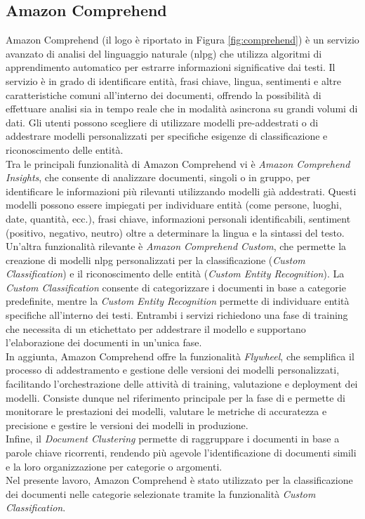 \subsection{Amazon Comprehend}
Amazon Comprehend (il logo è riportato in Figura \ref{fig:comprehend}) è un servizio avanzato di analisi del linguaggio naturale (\gls{nlpg}) che utilizza algoritmi di apprendimento automatico per estrarre informazioni significative dai testi. Il servizio è in grado di identificare entità, frasi chiave, lingua, sentimenti e altre caratteristiche comuni all'interno dei documenti, offrendo la possibilità di effettuare analisi sia in tempo reale che in modalità asincrona su grandi volumi di dati. Gli utenti possono scegliere di utilizzare modelli pre-addestrati o di addestrare modelli personalizzati per specifiche esigenze di classificazione e riconoscimento delle entità.\\
Tra le principali funzionalità di Amazon Comprehend vi è \textit{Amazon Comprehend Insights}, che consente di analizzare documenti, singoli o in gruppo, per identificare le informazioni più rilevanti utilizzando modelli già addestrati. Questi modelli possono essere impiegati per individuare entità (come persone, luoghi, date, quantità, ecc.), frasi chiave, informazioni personali identificabili, 
sentiment (positivo, negativo, neutro) oltre a determinare la lingua e la sintassi del testo.\\
Un'altra funzionalità rilevante è \textit{Amazon Comprehend Custom}, che permette la creazione di modelli \gls{nlpg} personalizzati per la classificazione (\textit{Custom Classification}) e il riconoscimento delle entità (\textit{Custom Entity Recognition}). La \textit{Custom Classification} consente di categorizzare i documenti in base a categorie predefinite, mentre la \textit{Custom Entity Recognition} permette di individuare entità specifiche all'interno dei testi. Entrambi i servizi richiedono una fase di training che necessita di un  etichettato per addestrare il modello e supportano l'elaborazione dei documenti in un'unica fase.\\
In aggiunta, Amazon Comprehend offre la funzionalità \textit{Flywheel}, che semplifica il processo di addestramento e gestione delle versioni dei modelli personalizzati, facilitando l'orchestrazione delle attività di training, valutazione e deployment dei modelli. Consiste dunque nel riferimento principale per la fase di  e permette di monitorare le prestazioni dei modelli, valutare le metriche di accuratezza e precisione e gestire le versioni dei modelli in produzione.\\
Infine, il \textit{Document Clustering} permette di raggruppare i documenti in base a parole chiave ricorrenti, rendendo più agevole l'identificazione di documenti simili e la loro organizzazione per categorie o argomenti.\\
Nel presente lavoro, Amazon Comprehend è stato utilizzato per la classificazione dei documenti nelle categorie selezionate tramite la funzionalità \textit{Custom Classification}.

